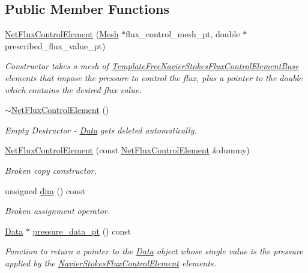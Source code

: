 \subsection*{Public Member Functions}
\begin{DoxyCompactItemize}
\item 
\hyperlink{classoomph_1_1NetFluxControlElement_aa855e7600ca93b005e63c8b2d4484f45}{Net\+Flux\+Control\+Element} (\hyperlink{classoomph_1_1Mesh}{Mesh} $\ast$flux\+\_\+control\+\_\+mesh\+\_\+pt, double $\ast$prescribed\+\_\+flux\+\_\+value\+\_\+pt)
\begin{DoxyCompactList}\small\item\em Constructor takes a mesh of \hyperlink{classoomph_1_1TemplateFreeNavierStokesFluxControlElementBase}{Template\+Free\+Navier\+Stokes\+Flux\+Control\+Element\+Base} elements that impose the pressure to control the flux, plus a pointer to the double which contains the desired flux value. \end{DoxyCompactList}\item 
\hyperlink{classoomph_1_1NetFluxControlElement_a7a321d25a4fc51822abe7c92c8f37b94}{$\sim$\+Net\+Flux\+Control\+Element} ()
\begin{DoxyCompactList}\small\item\em Empty Destructor -\/ \hyperlink{classoomph_1_1Data}{Data} gets deleted automatically. \end{DoxyCompactList}\item 
\hyperlink{classoomph_1_1NetFluxControlElement_a3ee9cdd9d404f577db1d18bf4c5e1ae1}{Net\+Flux\+Control\+Element} (const \hyperlink{classoomph_1_1NetFluxControlElement}{Net\+Flux\+Control\+Element} \&dummy)
\begin{DoxyCompactList}\small\item\em Broken copy constructor. \end{DoxyCompactList}\item 
unsigned \hyperlink{classoomph_1_1NetFluxControlElement_ada42257a8f26546b44182fe463f200bf}{dim} () const
\begin{DoxyCompactList}\small\item\em Broken assignment operator. \end{DoxyCompactList}\item 
\hyperlink{classoomph_1_1Data}{Data} $\ast$ \hyperlink{classoomph_1_1NetFluxControlElement_ac19688739022d56b66e74c14fedb7c4a}{pressure\+\_\+data\+\_\+pt} () const
\begin{DoxyCompactList}\small\item\em Function to return a pointer to the \hyperlink{classoomph_1_1Data}{Data} object whose single value is the pressure applied by the \hyperlink{classoomph_1_1NavierStokesFluxControlElement}{Navier\+Stokes\+Flux\+Control\+Element} elements. \end{DoxyCompactList}\item 

\end{DoxyCompactItemize}
